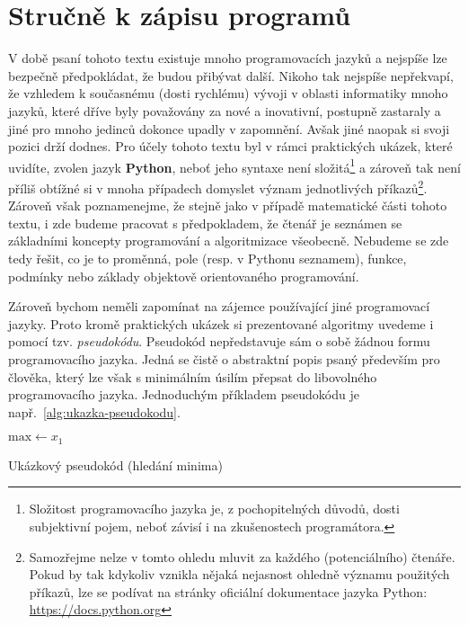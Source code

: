\section{Stručně k zápisu programů}\label{sec:zapis-programu}

V době psaní tohoto textu existuje mnoho programovacích jazyků a nejspíše lze bezpečně předpokládat, že budou přibývat další. Nikoho tak nejspíše nepřekvapí, že vzhledem k současnému (dosti rychlému) vývoji v oblasti informatiky mnoho jazyků, které dříve byly považovány za nové a inovativní, postupně zastaraly a jiné pro mnoho jedinců dokonce upadly v zapomnění. Avšak jiné naopak si svoji pozici drží dodnes. Pro účely tohoto textu byl v rámci praktických ukázek, které uvidíte, zvolen jazyk \textbf{Python}, neboť jeho syntaxe není složitá\footnote{Složitost programovacího jazyka je, z pochopitelných důvodů, dosti subjektivní pojem, neboť závisí i na zkušenostech programátora.} a zároveň tak není příliš obtížné si v mnoha případech domyslet význam jednotlivých příkazů\footnote{Samozřejme nelze v tomto ohledu mluvit za každého (potenciálního) čtenáře. Pokud by tak kdykoliv vznikla nějaká nejasnost ohledně významu použitých příkazů, lze se podívat na stránky oficiální dokumentace jazyka Python: \url{https://docs.python.org}}. Zároveň však poznamenejme, že stejně jako v případě matematické části tohoto textu, i zde budeme pracovat s předpokladem, že čtenář je seznámen se základními koncepty programování a algoritmizace všeobecně. Nebudeme se zde tedy řešit, co je to proměnná, pole (resp. v Pythonu seznamem), funkce, podmínky nebo základy objektově orientovaného programování.

Zároveň bychom neměli zapomínat na zájemce používající jiné programovací jazyky. Proto kromě praktických ukázek si prezentované algoritmy uvedeme i pomocí tzv. \emph{pseudokódu}. Pseudokód nepředstavuje sám o sobě žádnou formu programovacího jazyka. Jedná se čistě o abstraktní popis psaný především pro člověka, který lze však s minimálním úsilím přepsat do libovolného programovacího jazyka. Jednoduchým příkladem pseudokódu je např.~\ref{alg:ukazka-pseudokodu}.
\begin{algorithm}
    $\text{max}\gets x_1$\;
    \caption{Ukázkový pseudokód (hledání minima)}
    \label{alg:ukazka-pseudokodu}
\end{algorithm}

